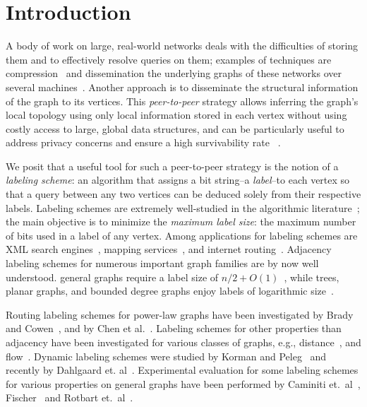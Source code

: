 

\section{Introduction}
A body of work on large, real-world networks  deals with the difficulties of storing them and to effectively resolve queries on them; examples of techniques are
compression~\cite{boldi2004webgraph,boldi2011layered} and dissemination  the underlying graphs of these networks over several machines~\cite{gonzalez2012powergraph, stanton2012streaming}.
Another approach is to disseminate the structural information of the graph to its vertices. This \emph{peer-to-peer} strategy allows inferring the graph's local topology using only local information stored in each vertex without using costly access to large, global data structures, and can be particularly useful to address privacy concerns and ensure a high survivability rate ~\cite{buchegger2009peerson}.

We posit that a useful tool for such a peer-to-peer strategy is the notion of a \emph{labeling scheme}: an algorithm that assigns a bit string--a \emph{label}--to each vertex so that a query between any two vertices can be deduced solely from their respective labels. 
Labeling schemes are extremely well-studied in the algorithmic literature~\cite{katz2004labeling,gavoillea2004distance,brady2006compact,gavoille2007shorter,korman2007compact,Korman07,korman2007general,caminiti2008engineering,dahlgaard2014dynamic,rotbart2014evaluation,alstrup2014adjacency}; the main objective is to minimize the \emph{maximum label size}: the maximum number of bits used in a label of any vertex. Among applications for labeling schemes are  XML search engines~\cite{cohen2010labeling}, mapping services~\cite{abraham2011hub}, and internet routing~\cite{krioukov2004compact}.
Adjacency labeling schemes for  numerous important graph families are by now well understood. 
general graphs  require a label size of $n/2+O(1)$~\cite{moon1965minimal, alstrup2014adjacency}, while 
trees, planar graphs, and bounded degree graphs enjoy labels of logarithmic size~\cite{Alstrup02, gavoille2007shorter, adjiashvili2014labeling}. 

Routing labeling schemes for power-law graphs  have been investigated by Brady and Cowen~\cite{brady2006compact}, and by Chen et al.~\cite{chen2012compact}. Labeling schemes for other properties than adjacency have been investigated for various classes of graphs, e.g., distance~\cite{gavoillea2004distance}, and flow~\cite{katz2004labeling}. 
Dynamic labeling schemes were studied by Korman and Peleg~\cite{korman2007compact,Korman07,korman2007general} and recently by Dahlgaard et. al~\cite{dahlgaard2014dynamic}.
Experimental evaluation for some labeling schemes for various properties on general graphs have been performed by Caminiti et.~al~\cite{caminiti2008engineering}, Fischer~\cite{fischer2009short} and Rotbart et.~al~\cite{rotbart2014evaluation}.


